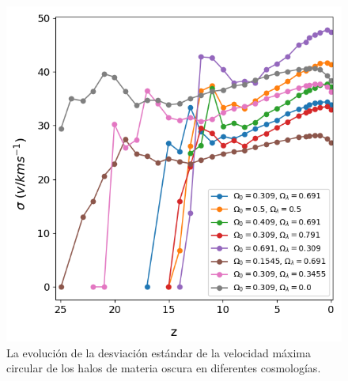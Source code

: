\documentclass{beamer}
\begin{document}
\begin{frame}
\begin{columns}[t]
			\begin{column}{.5\textwidth}
				\begin{figure}
					\centering
					\includegraphics[scale=0.27]{Conc/VelMax_Std_Conc.png}
					\caption{\footnotesize La evolución de la desviación estándar de la velocidad máxima circular de los halos de materia oscura en diferentes cosmologías.}
					\label{fig:Conc-VelMaxStd}
				\end{figure}
			\end{column}
		\end{columns}

	\end{frame}	

\end{document}
